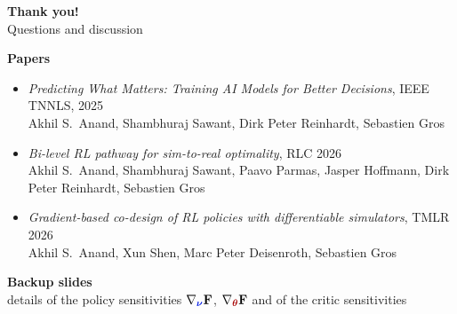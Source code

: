\documentclass[lecture]{beamer}
\newcommand{\vect}[1]{\ensuremath{\boldsymbol{\mathrm{#1}}}}
\newcommand{\mth}{\textcolor{myRed2}{\vect\theta}}
\newcommand{\pnu}{\textcolor{myBlue3}{\vect\nu}}
\newcommand{\Fres}{\vect F}
\begin{document}
\begin{frame}
\begin{center}
{\Large\textbf{Thank you!}}\\[8pt]
{\large Questions and discussion}
\end{center}
\vspace{.8cm}
{\footnotesize
\textbf{Papers}
\begin{itemize}
\setlength{\itemsep}{6pt}
\item \textit{Predicting What Matters: Training AI Models for Better Decisions}, IEEE TNNLS, 2025\\
{\scriptsize Akhil S.~Anand, Shambhuraj Sawant, Dirk Peter Reinhardt, Sebastien Gros}
\item \textit{Bi-level RL pathway for sim-to-real optimality}, RLC 2026\\
{\scriptsize Akhil S.~Anand, Shambhuraj Sawant, Paavo Parmas, Jasper Hoffmann, Dirk Peter Reinhardt, Sebastien Gros}
\item \textit{Gradient-based co-design of RL policies with differentiable simulators}, TMLR 2026\\
{\scriptsize Akhil S.~Anand, Xun Shen, Marc Peter Deisenroth, Sebastien Gros}
\end{itemize}}
\end{frame}

\begin{frame}[noframenumbering]
\begin{center}
{\Large\textbf{Backup slides}}\\[6pt]
{\small details of the policy sensitivities $\nabla_{\pnu}\Fres$, $\nabla_{\mth}\Fres$ and of the critic sensitivities}
\end{center}
\end{frame}
\end{document}

